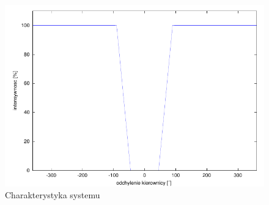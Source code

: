 \begin{figure}[!h]
\centering
\includegraphics[scale=1.0]{src/char_swiatla_intensywnosc.pdf}\caption{\label{fig:dane1}Charakterystyka systemu}
\end{figure}

